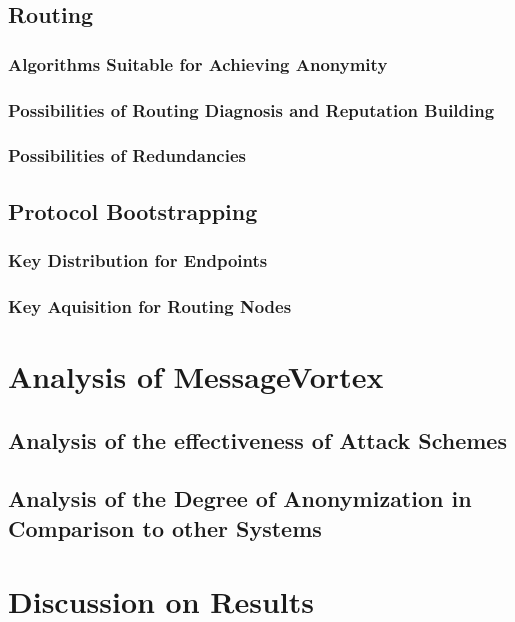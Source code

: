 \chapter{Routing}
\section{Algorithms Suitable for Achieving Anonymity}
\section{Possibilities of Routing Diagnosis and Reputation Building}
\section{Possibilities of Redundancies}

\chapter{Protocol Bootstrapping}
\section{Key Distribution for Endpoints}
\section{Key Aquisition for Routing Nodes}


\part{Analysis of MessageVortex}
\chapter{Analysis of the effectiveness of Attack Schemes}
\chapter{Analysis of the Degree of Anonymization in Comparison to other Systems}

\part{Discussion on Results}

